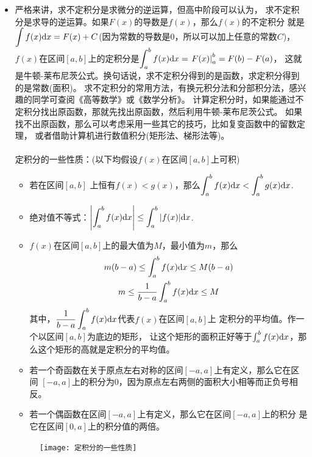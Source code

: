 \begin{itemize}[leftmargin=\inteval{\myitemleftmargin}pt,itemsep=
   \inteval{\myitemitempsep}pt,topsep=\inteval{\myitemtopsep}pt]
\item 严格来讲，求不定积分是求微分的逆运算，但高中阶段可以认为，
求不定积分是求导的逆运算。如果$ F(x) $的导数是$ f(x) $，那么$ f(x) $的不定积分
就是$ \displaystyle\int f(x)\mathrm{d} x=F(x)+C $(因为常数的导数是0，所以可以加上任意的常数$ C $)，
$ f(x) $在区间$ [a,b] $上的定积分是$ \displaystyle \int_a^b f(x)\mathrm{d} x=\left.F(x)
\right|_a^b=F(b)-F(a) $，
这就是牛顿-莱布尼茨公式。换句话说，求不定积分得到的是函数，求定积分得到的是常数(面积)。
求不定积分的常用方法，有换元积分法和分部积分法，感兴趣的同学可查阅《高等数学》或《数学分析》。
计算定积分时，如果能通过不定积分找出原函数，那就先找出原函数，然后利用牛顿-莱布尼茨公式。
如果找不出原函数，那么可以考虑采用一些其它的技巧，比如复变函数中的留数定理，
或者借助计算机进行数值积分(矩形法、梯形法等)。\\
\\
定积分的一些性质：(以下均假设$ f(x) $在区间$ [a,b] $上可积)
\begin{itemize}[itemsep=-1pt]
\item 若在区间$ [a,b] $ 上恒有$ f(x)<g(x)$，那么$ \displaystyle \int_a^b f(x)\mathrm{d} x<
\int_a^b g(x)\mathrm{d} x $. 
\item 绝对值不等式：$ \displaystyle \left|\int_a^b f(x)\mathrm{d} x\right|\leq\int_a^b |f(x)|\mathrm{d} x $.
\item $ f(x) $在区间$ [a,b] $上的最大值为$ M $，最小值为$ m $，那么
\begin{gather*}
    m(b-a)\leq \int_a^b f(x)\mathrm{d} x \leq M(b-a) \\
    m \leq \dfrac{1}{b-a}\int_a^b f(x)\mathrm{d} x \leq M
\end{gather*}
其中，$ \displaystyle \dfrac{1}{b-a}\int_a^b f(x)\mathrm{d} x $代表$ f(x) $在区间$ [a,b] $上
定积分的平均值。作一个以区间$ [a,b] $为底边的矩形，
让这个矩形的面积正好等于$ \int_a^b f(x)\mathrm{d} x $，那么这个矩形的高就是定积分的平均值。
\item 若一个奇函数在关于原点左右对称的区间$ [-a,a] $上有定义，那么它在区间
$ [-a,a] $上的积分为0，因为原点左右两侧的面积大小相等而正负号相反。
\item 若一个偶函数在区间$ [-a,a] $上有定义，那么它在区间$ [-a,a] $上的积分
是它在区间$ [0,a] $上的积分值的两倍。
\end{itemize}
\begin{figure}[h]
    \centering
    \texttt{[image: 定积分的一些性质]}
\end{figure}  


\end{itemize}
